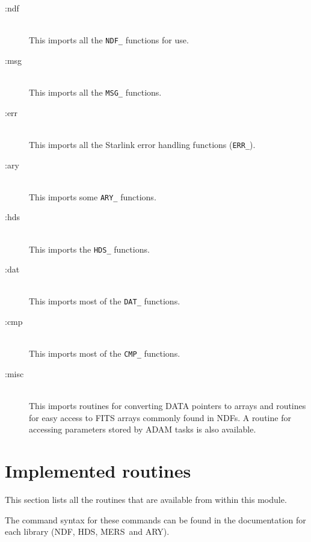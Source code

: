 \documentclass[twoside,11pt]{article}
\newcommand{\xref}[3]{#1}
\newcommand{\xlabel}[1]{}
\newcommand{\ndf}{\xref{NDF}{sun33}{}}
\newcommand{\hds}{\xref{HDS}{sun92}{}}
\newcommand{\ary}{\xref{ARY}{sun11}{}}
\newcommand{\mers}{\xref{MERS}{sun104}{}}
\begin{document}
\begin{description}

\item[:ndf]%
%
\hfil\\
This imports all the \texttt{NDF\_} functions for use.

\item[:msg]%
%
\hfil\\
This imports all the \texttt{MSG\_} functions.

\item[:err]%
%
\hfil\\
This imports all the Starlink error handling functions (\texttt{ERR\_}).

\item[:ary]%
%
\hfil\\
This imports some \texttt{ARY\_} functions.

\item[:hds]%
%
\hfil\\
This imports the \texttt{HDS\_} functions.

\item[:dat]%
%
\hfil\\
This imports most of the \texttt{DAT\_} functions.

\item[:cmp]%
%
\hfil\\
This imports most of the \texttt{CMP\_} functions.

\item[:misc]%
%
\hfil\\
This imports routines for converting DATA pointers to arrays and routines for
easy access to FITS arrays commonly found in NDFs. A routine for accessing
parameters stored by ADAM tasks is also available.

\end{description}

\section{\xlabel{implemented_routines}Implemented routines}%
\label{implemented_routines}

This section lists all the routines that are available from within this module.

The command syntax for these commands can be found in the documentation
for each library (\ndf, \hds, \mers\ and \ary).
\end{document}
